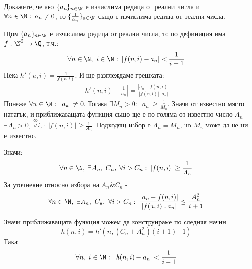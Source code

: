 \begin{problem}
     Докажете, че ако $\{a_n\}_{n\in\N}$ е изчислима редица от реални числа и $\forall n\in\N:\; a_n \neq 0$, то $\{\frac{1}{a_n}\}_{n\in\N}$ също е изчислима редица от реални числа.
\end{problem}
\begin{solution} \label{sol:computable-sequence-computable-inverse}
    Щом $\{a_n\}_{n\in\N}$ е изчислима редица от реални числа, то по дефиниция има $f: \N^2 \to \Q$, т.ч.:
    \begin{equation}
        \forall n\in\N,\ i\in\N:\; \left|f(n, i) - a_n\right| < \frac{1}{i+1}
    \end{equation}
    Нека $h'(n, i) = \frac{1}{f(n, i)}$. И ще разглеждаме грешката:
    \begin{equation}
        \begin{split}
            \left|h'(n, i) - \frac{1}{a_n}\right| = \frac{\left|a_n - f(n,i)\right|}{|f(n,i)|.|a_n|}
        \end{split}
    \end{equation}
    Понеже $\forall n\in\N:\; |a_n| \neq 0$. Тогава $\exists M_n > 0:\; |a_n| \geq \frac{1}{M_n}$. Значи от известно място нататък, и приближаващата функция също ще е по-голяма от известно число $A_n$ - $\exists A_n > 0,\ \overset{\infty}{\forall} i, :\; |f(n, i)| \geq \frac{1}{A_n}$. Подходящ избор е $A_n = M_n$, но $M_n$ може да не ни е известно.

    Значи:
    \begin{equation}
        \forall n\in\N,\ \exists A_n,\ C_n,\ \forall i > C_n:\; |f(n,i)| \geq \frac{1}{A_n}
    \end{equation}
    За уточнение относно избора на $A_n \& C_n $ - 
    \begin{equation}
        \forall n\in\N,\ \exists A_n,\ C_n,\ \forall i > C_n:\; \frac{\left|a_n - f(n,i)\right|}{|f(n,i)|.|a_n|} \leq \frac{A_n^2}{i+1}
    \end{equation}

    Значи приближаващата функция можем да конструираме по следния начин
    \begin{equation}
        h(n,i) = h'(n, (C_n + A_n^2)(i+1) \dot{-} 1)
    \end{equation}
    Така:
    \begin{equation}
        \forall n,\ i\in \N:\; \left|h(n, i) - a_n\right| < \frac{1}{i+1}
    \end{equation}
\end{solution}
